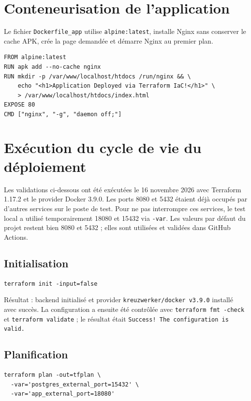 \documentclass[11pt,a4paper]{article}
\begin{document}
\section{Conteneurisation de l'application}

Le fichier \texttt{Dockerfile\_app} utilise \texttt{alpine:latest}, installe Nginx sans
conserver le cache APK, crée la page demandée et démarre Nginx au premier plan.

\begin{lstlisting}
FROM alpine:latest
RUN apk add --no-cache nginx
RUN mkdir -p /var/www/localhost/htdocs /run/nginx && \
    echo "<h1>Application Deployed via Terraform IaC!</h1>" \
    > /var/www/localhost/htdocs/index.html
EXPOSE 80
CMD ["nginx", "-g", "daemon off;"]
\end{lstlisting}

\section{Exécution du cycle de vie du déploiement}

Les validations ci-dessous ont été exécutées le 16 novembre 2026 avec Terraform
1.17.2 et le provider Docker 3.9.0. Les ports 8080 et 5432 étaient déjà occupés par
d'autres services sur le poste de test. Pour ne pas interrompre ces services, le test
local a utilisé temporairement 18080 et 15432 via \texttt{-var}. Les valeurs par défaut
du projet restent bien 8080 et 5432 ; elles sont utilisées et validées dans GitHub
Actions.

\subsection{Initialisation}

\begin{lstlisting}
terraform init -input=false
\end{lstlisting}

Résultat : backend initialisé et provider
\texttt{kreuzwerker/docker v3.9.0} installé avec succès. La configuration a ensuite été
contrôlée avec \texttt{terraform fmt -check} et \texttt{terraform validate} ; le résultat
était \texttt{Success! The configuration is valid.}

\subsection{Planification}

\begin{lstlisting}
terraform plan -out=tfplan \
  -var='postgres_external_port=15432' \
  -var='app_external_port=18080'
\end{lstlisting}
\end{document}

